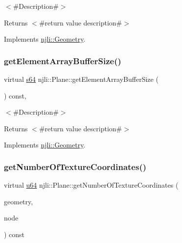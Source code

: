 $<$\#\+Description\#$>$

\begin{DoxyReturn}{Returns}
$<$\#return value description\#$>$ 
\end{DoxyReturn}


Implements \mbox{\hyperlink{classnjli_1_1_geometry_ac4edd389ae104da289e2282d780454f0}{njli\+::\+Geometry}}.

\mbox{\label{classnjli_1_1_plane_a5826539217d13c19c72ed6504d1b6d15}} 
\subsubsection{\texorpdfstring{get\+Element\+Array\+Buffer\+Size()}{getElementArrayBufferSize()}}
{\footnotesize\ttfamily virtual \mbox{\hyperlink{_util_8h_a4258bfb2c3a440d06c4aaa3c2b450dde}{s64}} njli\+::\+Plane\+::get\+Element\+Array\+Buffer\+Size (\begin{DoxyParamCaption}{ }\end{DoxyParamCaption}) const\hspace{0.3cm}{\ttfamily [protected]}, {\ttfamily [virtual]}}

$<$\#\+Description\#$>$

\begin{DoxyReturn}{Returns}
$<$\#return value description\#$>$ 
\end{DoxyReturn}


Implements \mbox{\hyperlink{classnjli_1_1_geometry_ac857e830af897450652aee0922e62e20}{njli\+::\+Geometry}}.

\mbox{\label{classnjli_1_1_plane_acac9e0af1f82ed239af270c9c50ec4ab}} 
\subsubsection{\texorpdfstring{get\+Number\+Of\+Texture\+Coordinates()}{getNumberOfTextureCoordinates()}}
{\footnotesize\ttfamily virtual \mbox{\hyperlink{_util_8h_ad758b7a5c3f18ed79d2fcd23d9f16357}{u64}} njli\+::\+Plane\+::get\+Number\+Of\+Texture\+Coordinates (\begin{DoxyParamCaption}\item[{\mbox{\hyperlink{classnjli_1_1_level_of_detail}{Level\+Of\+Detail}} $\ast$}]{geometry,  }\item[{\mbox{\hyperlink{classnjli_1_1_node}{Node}} $\ast$}]{node }\end{DoxyParamCaption}) const\hspace{0.3cm}{\ttfamily [virtual]}}

